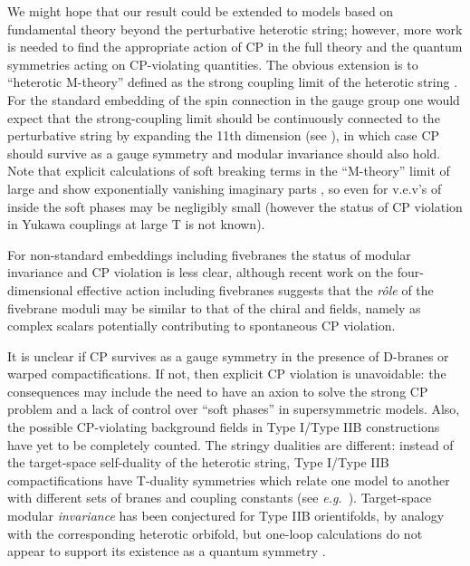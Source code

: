 \documentclass[a4paper,12pt]{article}
\begin{document}
We might hope that our result could be extended to models based on fundamental theory beyond the perturbative heterotic string; however, more work is needed to find the appropriate action of CP in the full theory and the quantum symmetries acting on CP-violating quantities. The obvious extension is to ``heterotic M-theory'' defined as the strong coupling limit of the heterotic string \cite{Horava_Witten}. For the standard embedding of the spin connection in the gauge group one would expect that the strong-coupling limit should be continuously connected to the perturbative string by expanding the 11th dimension (see \cite{NillesS97}), in which case CP should survive as a gauge symmetry and modular invariance should also hold. Note that explicit calculations of soft breaking terms in the ``M-theory'' limit of large \coordHE{} and \coordHE{} show exponentially vanishing imaginary parts \cite{BailinKL2000}, so even for v.e.v's of \coordHE{} inside \coordHE{} the soft phases may be negligibly small (however the status of CP violation in Yukawa couplings at large T is not known).

For non-standard embeddings including fivebranes the status of modular invariance and CP violation is less clear, although recent work on the four-dimensional effective action including fivebranes \cite{DerendingerS} suggests that the {\em r\^ole}\/ of the fivebrane moduli may be similar to that of the chiral \coordHE{} and \coordHE{} fields, namely as complex scalars potentially contributing to spontaneous CP violation.

It is unclear if CP survives as a gauge symmetry in the presence of D-branes or warped compactifications. If not, then explicit CP violation is unavoidable: the consequences may include the need to have an axion to solve the strong CP problem and a lack of control over ``soft phases'' in supersymmetric models. Also, the possible CP-violating background fields in Type I/Type IIB constructions have yet to be completely counted. The stringy dualities are different: instead of the target-space self-duality of the heterotic string, Type I/Type IIB compactifications have T-duality symmetries which relate one model to another with different sets of branes and coupling constants (see {\em e.g.\/}\ \cite{Ibanez:1999rf}). Target-space modular {\em invariance}\/ has been conjectured for Type IIB orientifolds, by analogy with the corresponding heterotic orbifold, but one-loop calculations do not appear to support its existence as a quantum symmetry \cite{Lalak:2000ex}. 
\end{document}
